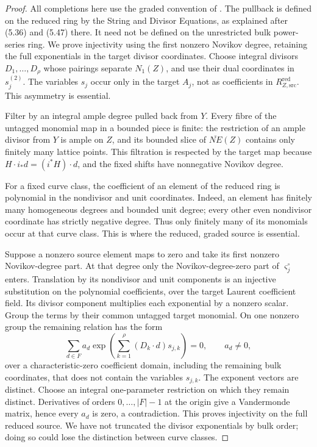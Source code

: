 \begin{proof}
All completions here use the graded convention of
\cite[Section~2.2]{IritaniBlowup}.  The pullback is defined on the reduced
ring by the String and Divisor Equations, as explained after (5.36) and
(5.47) there.  It need not be defined on the unrestricted bulk power-series
ring.  We prove injectivity using the first nonzero Novikov degree, retaining
the full exponentials in the target divisor coordinates.
Choose integral divisors \(D_1,\ldots,D_\rho\) whose pairings separate
\(N_1(Z)\), and use their dual coordinates in \(s_j^{(2)}\).  The variables
\(s_j\) occur only in the target \(A_j\), not as coefficients in
\(R_{Z,\mathrm{src}}^{\mathrm{red}}\).  This asymmetry is essential.

Filter by an integral ample degree pulled back from \(Y\).  Every fibre of
the untagged monomial map in a bounded piece is finite: the restriction
of an ample divisor from \(Y\) is
ample on \(Z\), and its bounded slice of \(\overline{NE}(Z)\) contains only
finitely many lattice points.  This filtration is respected by the target
map because \(H\cdot i_*d=(i^*H)\cdot d\), and the fixed shifts have
nonnegative Novikov degree.

For a fixed curve class, the coefficient of an element of the reduced ring
is polynomial in the nondivisor and unit coordinates.  Indeed, an element
has finitely many homogeneous degrees and bounded unit degree; every other
even nondivisor coordinate has strictly negative degree.  Thus only
finitely many of its monomials occur at that curve class.  This is where
the reduced, graded source is essential.

Suppose a nonzero source element maps to zero and take its first nonzero
Novikov-degree part.  At that degree only the Novikov-degree-zero part of
\(\varsigma_j^\circ\) enters.  Translation by its nondivisor and unit
components is an injective substitution on the polynomial coefficients,
over the target Laurent coefficient field.  Its divisor component
multiplies each exponential by a nonzero scalar.  Group the terms by their
common untagged target monomial.  On one nonzero group the
remaining relation has the form
\[
 \sum_{d\in F}a_d
 \exp\!\left(\sum_{k=1}^\rho(D_k\cdot d)s_{j,k}\right)=0,
 \qquad a_d\ne0,
\]
over a characteristic-zero coefficient domain, including the remaining bulk
coordinates, that does not contain the variables \(s_{j,k}\).
The exponent vectors are distinct.  Choose an integral
one-parameter restriction on which they remain distinct.  Derivatives of
orders \(0,\ldots,|F|-1\) at the origin give a Vandermonde matrix, hence every
\(a_d\) is zero, a contradiction.  This proves injectivity on the full
reduced source.  We have not truncated the divisor exponentials by bulk
order; doing so could lose the distinction between curve classes.


\end{proof}
